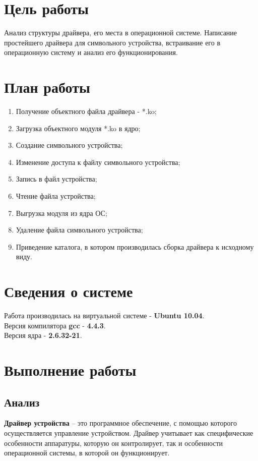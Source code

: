 


\tableofcontents
\clearpage

\section{Цель работы}
Анализ структуры драйвера, его места в операционной системе. Написание простейшего драйвера для символьного устройства, встраивание его в операционную систему и анализ его функционирования.


\section{План работы}
\begin{enumerate}
\item Получение объектного файла драйвера - *.ko;
\item Загрузка объектного модуля *.ko в ядро;
\item Создание символьного устройства;
\item Изменение доступа к файлу символьного устройства;
\item Запись в файл устройства;
\item Чтение файла устройства;
\item Выгрузка модуля из ядра ОС;
\item Удаление файла символьного устройства;
\item Приведение каталога, в котором производилась сборка драйвера к исходному виду.
\end{enumerate}

\section{Сведения о системе}
Работа производилась на виртуальной системе - \textbf{Ubuntu 10.04}.\\Версия компилятора \textbf{gcc} - \textbf{4.4.3}.\\Версия ядра - \textbf{2.6.32-21}.

\section{Выполнение работы}
\subsection{Анализ}
\textbf{Драйвер устройства} – это программное обеспечение, с помощью которого осуществляется управление устройством. Драйвер учитывает как специфические особенности аппаратуры, которую он контролирует, так и особенности операционной системы, в которой он функционирует. 


